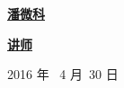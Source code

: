 \begin{flushleft}
	{\kaishu\underline{\hspace{1.8cm}\textbf{潘微科}\hspace{3.5cm}} }                         \\
	\vspace{10bp}
	
	{\kaishu\underline{\hspace{3.2cm}\textbf{讲师}\hspace{3.8cm}} }                         \\
	
\end{flushleft}

\vskip 4cm

\centerline{ 2016 年 \  4 月\  30 日}